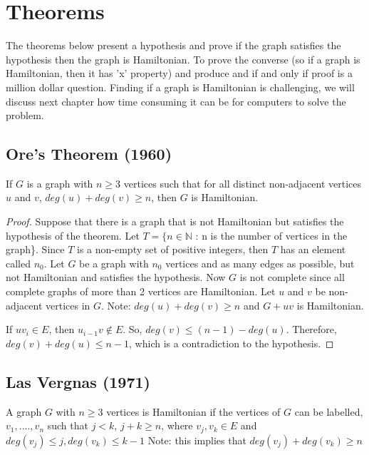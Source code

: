   \newpage

    \section{Theorems}
  The theorems below present a hypothesis and prove if the graph satisfies the hypothesis then the graph is Hamiltonian. To prove the converse (so if a graph is Hamiltonian, then it has 'x' property) and produce and if and only if proof is a million dollar question. Finding if a graph is Hamiltonian is challenging, we will discuss next chapter how time consuming it can be for computers to solve the problem. 
    \subsection{Ore's Theorem (1960)}
  If $G$ is a graph with $n \geq 3$ vertices such that for all distinct non-adjacent vertices $u$ and $v$, $deg(u) + deg(v) \geq n$, then $G$ is Hamiltonian.
    \begin{proof}
	    Suppose that there is a graph that is not Hamiltonian but satisfies the hypothesis of the theorem. Let $T = \{n \in \mathbb{N} $ : n is the number of vertices in the graph\}. Since $T$ is a non-empty set of positive integers, then $T$ has an element called $n_{0}$. Let $G$ be a graph with $n_{0}$ vertices and as many edges as possible, but not Hamiltonian and satisfies the hypothesis. Now $G$ is not complete since all complete graphs of more than 2 vertices are Hamiltonian. Let $u$ and $v$ be non-adjacent vertices in $G$. Note: $deg(u) + deg(v) \geq n$ and $G + uv$ is Hamiltonian. 
  \begin{center}
  \end{center}
    
    
    If $uv_{i} \in E$, then $u_{i-1}v \notin E$. So, $deg(v) \leq (n-1) - deg(u)$. Therefore, $deg(v) + deg(u) \leq n - 1$, which is a contradiction to the hypothesis.\cite{Ore'sTheorem}
    \end{proof}
  \subsection{Las Vergnas (1971)}
  A graph $G$ with $n \geq 3$ vertices is Hamiltonian if the vertices of $G$ can be labelled, $v_{1}, .... ,v_{n}$ such that $j < k$, $j + k \geq n$, where $v_{j}, v_{k} \in E$ and $deg(v_{j}) \leq j, deg(v_{k}) \leq k - 1$ Note: this implies that $deg(v_{j}) + deg(v_{k}) \geq n$
